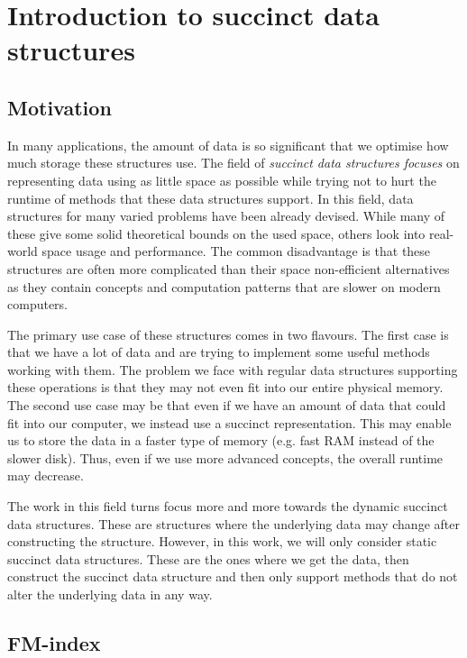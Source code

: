 \chapter{Introduction to succinct data structures}
\label{kap:kap1}

\section{Motivation}

In many applications, the amount of data is so significant that we optimise how much
storage these structures use. The field of \textit{succinct data structures focuses}
on representing data using as little space as possible while trying not to hurt the
runtime of methods that these data structures support. In this field, data structures
for many varied problems have been already devised. While many of these give some solid
theoretical bounds on the used space, others look into real-world space usage and
performance. The common disadvantage is that these structures are often more complicated
than their space non-efficient alternatives as they contain concepts and computation
patterns that are slower on modern computers.

The primary use case of these structures comes in two flavours. The first case is
that we have a lot of data and are trying to implement some useful methods working
with them. The problem we face with regular data structures supporting these
operations is that they may not even fit into our entire physical memory. The
second use case may be that even if we have an amount of data that could fit
into our computer, we instead use a succinct representation. This may enable us
to store the data in a faster type of memory (e.g. fast RAM instead of the
slower disk). Thus, even if we use more advanced concepts, the overall runtime
may decrease.

The work in this field turns focus more and more towards the dynamic succinct
data structures. These are structures where the underlying data may change after
constructing the structure. However, in this work, we will only consider static
succinct data structures. These are the ones where we get the data, then construct
the succinct data structure and then only support methods that do not alter the
underlying data in any way.

\section{FM-index}

